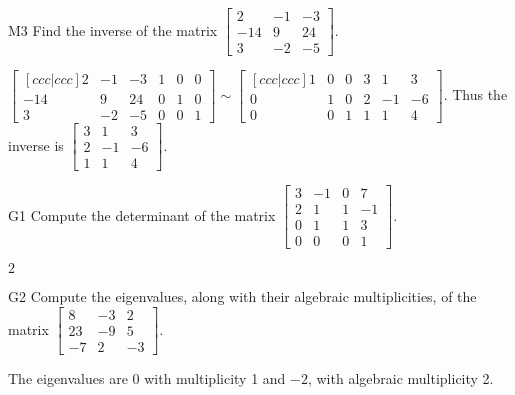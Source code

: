 \documentclass{sbgLAsemi}
\begin{document}
\begin{problem}{M3}
  Find the inverse of the matrix
  \(\begin{bmatrix}
    2 & -1 & -3  \\
    -14 & 9 & 24  \\
    3 & -2 & -5
  \end{bmatrix}\).
\end{problem}
\begin{solution}
  \(\begin{bmatrix}[ccc|ccc]
    2 & -1 & -3 & 1 & 0 & 0 \\
    -14 & 9 & 24 & 0 & 1 & 0 \\
    3 & -2 & -5 & 0 & 0 & 1
  \end{bmatrix}\sim\begin{bmatrix}[ccc|ccc]
    1 & 0 & 0 & 3 & 1 & 3  \\
    0 & 1 & 0 & 2 & -1 & -6  \\
    0 & 0 & 1 & 1 & 1 & 4
  \end{bmatrix}\). Thus the inverse is
  \(\begin{bmatrix}
    3 & 1 & 3  \\
    2 & -1 & -6  \\
    1 & 1 & 4
  \end{bmatrix}\).
\end{solution}
\begin{problem}{G1}
Compute the determinant of the matrix $\begin{bmatrix} 3 & -1 & 0  & 7 \\ 2 & 1 & 1 & -1  \\ 0 & 1 & 1 & 3 \\ 0 & 0 & 0 & 1   \end{bmatrix}$.
\end{problem}
\begin{solution}
$2$
\end{solution}

\begin{problem}{G2} 
Compute the eigenvalues, along with their algebraic multiplicities, of the matrix $ \begin{bmatrix} 8 & -3 & 2 \\ 23 & -9 & 5 \\ -7 & 2 & -3 \end{bmatrix}$.
\end{problem}
\begin{solution}
The eigenvalues are $0$ with multiplicity 1 and $-2$, with algebraic multiplicity 2.
\end{solution}
\end{document}
